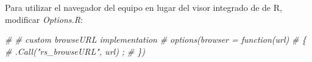 \documentclass[
]{book}
\newenvironment{Shaded}{\begin{snugshade}}{\end{snugshade}}
\newcommand{\CommentTok}[1]{\textcolor[rgb]{0.56,0.35,0.01}{\textit{#1}}}
\begin{document}
Para utilizar el navegador del equipo en lugar del visor integrado de de R, modificar \emph{Options.R}:

\begin{Shaded}
\begin{Highlighting}[]
\CommentTok{# # custom browseURL implementation}
\CommentTok{# options(browser = function(url)}
\CommentTok{# \{}
\CommentTok{#    .Call("rs_browseURL", url) ;}
\CommentTok{# \})}
\end{Highlighting}
\end{Shaded}

  
\end{document}
